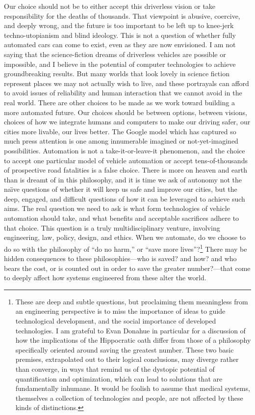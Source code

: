 Our choice should not be to either accept this driverless vision or take
responsibility for the deaths of thousands. That viewpoint is abusive, coercive,
and deeply wrong, and the future is too important to be left up to
knee-jerk techno-utopianism and blind ideology. This is not a question
of whether fully automated cars can come to exist, even as they are
now envisioned. I am not saying that the science-fiction dreams of
driverless vehicles are possible or impossible, and I believe in the
potential of computer technologies to achieve groundbreaking results.
But many worlds that look lovely in science fiction represent places
we may not actually wish to live, and these portrayals can afford to
avoid issues of reliability and human interaction that we cannot avoid
in the real world. There are other choices to be made as we work toward building a
more automated future. Our choices should be between options, between
visions, choices of how we integrate humans and computers to make our
driving safer, our cities more livable, our lives better. The Google model which has
captured so much press attention is one among innumerable imagined or
not-yet-imagined possibilities. Automation is not a
take-it-or-leave-it phenomenon, and the choice to accept one
particular model of vehicle automation or accept tens-of-thousands of
prospective road fatalities is a false choice. There is more on heaven
and earth than is dreamt of in this philosophy, and it is time we ask
of autonomy not the na\"{\i}ve questions of whether it will keep us
safe and improve our cities, but the deep, engaged, and difficult
questions of how it can be leveraged to achieve such aims. The real
question we need to ask is what form technologies of vehicle automation 
should take, and what benefits and acceptable sacrifices adhere to
that choice. This question is a truly multidisciplinary venture,
involving engineering, law, policy, design, and ethics. When we
automate, do we choose to do so with the philosophy of ``do no harm,''
or ``save more lives''?\footnote{These are deep and subtle questions,
  but proclaiming them meaningless from an engineering perspective is
  to miss the importance of ideas to guide technological development,
  and the social importance of developed technologies. I am grateful
  to Evan Donahue in particular for a discussion of how the
  implications of the Hippocratic oath differ from those of a
  philosophy specifically oriented around saving the greatest number.
  These two basic premises, extrapolated out to their logical
  conclusions, may diverge rather than converge, in ways that remind
  us of the dystopic potential of quantification and optimization,
  which can lead to solutions that are fundamentally inhumane. It
  would be foolish 
  to assume that medical systems, themselves a collection of
  technologies and people, are not affected by these kinds of distinctions.} There may be hidden consequences to these
philosophies---who is saved? and how? and who bears the cost, or is
counted out in order to save the greater number?---that come to deeply
affect how systems engineered from these alter the world.


